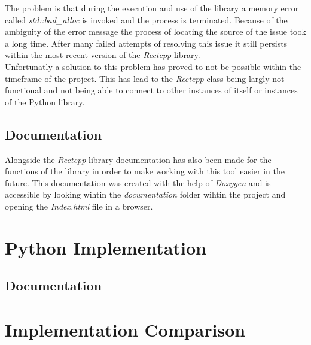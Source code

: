 The problem is that during the execution and use of the library a memory error called \textit{std::bad\_alloc} is invoked and the process is terminated. Because of 
the ambiguity of the error message the process of locating the source of the issue took a long time. After many failed attempts of resolving this issue it still
persists within the most recent version of the \textit{Rectcpp} library.\\

Unfortunatly a solution to this problem has proved to not be possible within the timeframe of the project. This has lead to the \textit{Rectcpp} class being 
largly not functional and not being able to connect to other instances of itself or instances of the Python library.

\subsection{Documentation}
Alongside the \textit{Rectcpp} library documentation has also been made for the functions of the library in order to make working with this tool easier in the future.
This documentation was created with the help of \textit{Doxygen} and is accessible by looking wihtin the \textit{documentation} folder wihtin the project and opening
the \textit{Index.html} file in a browser. 

\section{Python Implementation}

\subsection{Documentation}

\section{Implementation Comparison}

\filbreak
